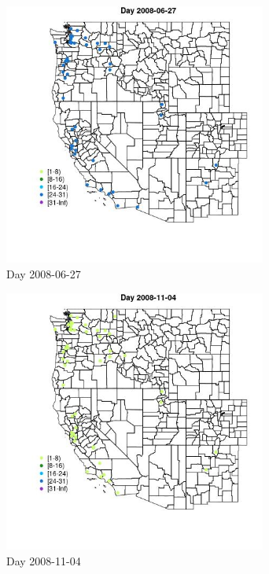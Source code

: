 \begin{figure} 
\centering  
\includegraphics[width=0.77\textwidth]{Code_Outputs/Report_ML_input_PM25_Step4_part_e_de_duplicated_aves_MapObsDay2008-06-27.jpg} 
\caption{\label{fig:Report_ML_input_PM25_Step4_part_e_de_duplicated_avesMapObsDay2008-06-27}Day 2008-06-27} 
\end{figure} 
 

\begin{figure} 
\centering  
\includegraphics[width=0.77\textwidth]{Code_Outputs/Report_ML_input_PM25_Step4_part_e_de_duplicated_aves_MapObsDay2008-11-04.jpg} 
\caption{\label{fig:Report_ML_input_PM25_Step4_part_e_de_duplicated_avesMapObsDay2008-11-04}Day 2008-11-04} 
\end{figure} 
 

